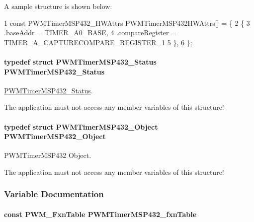 A sample structure is shown below\+: 
\begin{DoxyCode}
1 const PWMTimerMSP432\_HWAttrs PWMTimerMSP432HWAttrs[] = \{
2     \{
3         .baseAddr = TIMER\_A0\_BASE,
4         .compareRegister = TIMER\_A\_CAPTURECOMPARE\_REGISTER\_1
5     \},
6 \};
\end{DoxyCode}
\paragraph[{P\+W\+M\+Timer\+M\+S\+P432\+\_\+\+Status}]{\setlength{\rightskip}{0pt plus 5cm}typedef struct {\bf P\+W\+M\+Timer\+M\+S\+P432\+\_\+\+Status}  {\bf P\+W\+M\+Timer\+M\+S\+P432\+\_\+\+Status}}\label{_p_w_m_timer_m_s_p432_8h_af75fb1cc6f34e3383ce5d416b90961de}


\hyperlink{struct_p_w_m_timer_m_s_p432___status}{P\+W\+M\+Timer\+M\+S\+P432\+\_\+\+Status}. 

The application must not access any member variables of this structure! 
\paragraph[{P\+W\+M\+Timer\+M\+S\+P432\+\_\+\+Object}]{\setlength{\rightskip}{0pt plus 5cm}typedef struct {\bf P\+W\+M\+Timer\+M\+S\+P432\+\_\+\+Object}  {\bf P\+W\+M\+Timer\+M\+S\+P432\+\_\+\+Object}}\label{_p_w_m_timer_m_s_p432_8h_af38839ac281ee06be9b0aaa2b5f04d13}


P\+W\+M\+Timer\+M\+S\+P432 Object. 

The application must not access any member variables of this structure! 

\subsubsection{Variable Documentation}
\paragraph[{P\+W\+M\+Timer\+M\+S\+P432\+\_\+fxn\+Table}]{\setlength{\rightskip}{0pt plus 5cm}const {\bf P\+W\+M\+\_\+\+Fxn\+Table} P\+W\+M\+Timer\+M\+S\+P432\+\_\+fxn\+Table}\label{_p_w_m_timer_m_s_p432_8h_a59f5d0f3c3d7da66fbfb61dc70dcac30}
